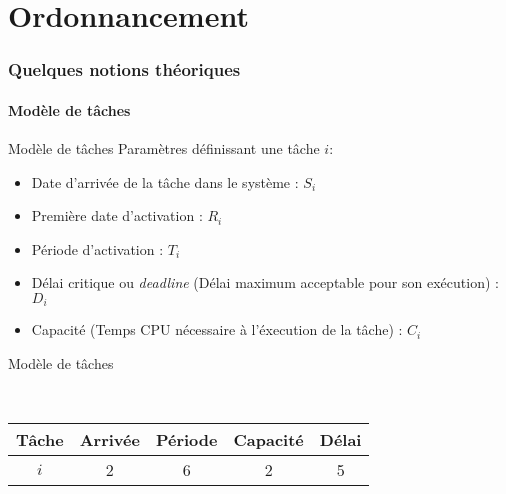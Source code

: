 %                                                    
%
%

\part{Ordonnancement}

\begin{frame}
  \partpage
\end{frame}

\begin{frame}
  \tableofcontents[currentpart]
\end{frame}

\section{Quelques notions théoriques}

\subsection{Modèle de tâches}

\begin{frame}{Modèle de tâches}
  Paramètres définissant une tâche $i$:
  \begin{itemize}
    \item Date d'arrivée de la tâche dans le système : $S_i$
    \item Première date d'activation : $R_i$
    \item Période d'activation : $T_i$
    \item Délai critique  ou \emph{deadline} (Délai maximum acceptable
      pour son exécution) : $D_i$
    \item Capacité (Temps CPU nécessaire à l'éxecution de la tâche) :
      $C_i$
  \end{itemize}
\end{frame}

\begin{frame}{Modèle de tâches}
  \begin{center}
    \\
    \begin{tabular}{ccccc}
      \hline
      Tâche & Arrivée & Période & Capacité & Délai \\
      \hline
      $i$ & 2 & 6 & 2 & 5\\
      \hline
    \end{tabular}
  \end{center}
\end{frame}

